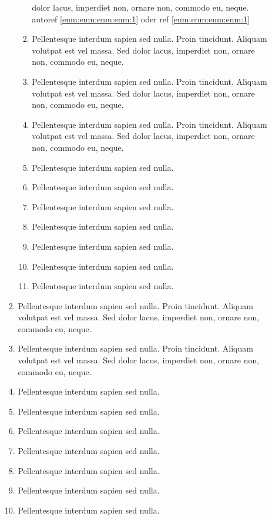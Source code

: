 \documentclass[ngerman]{scrartcl}
\begin{document}
\begin{enumerate}
\begin{enumerate}
\begin{enumerate}
\begin{enumerate}
		dolor lacus, imperdiet non, ornare non, commodo eu, neque.
											autoref \autoref{enm:enm:enm:enm:1} oder ref \ref{enm:enm:enm:enm:1}
								\item Pellentesque interdum sapien sed nulla. Proin tincidunt. Aliquam volutpat est vel massa. Sed
		dolor lacus, imperdiet non, ornare non, commodo eu, neque.\label{enm:enm:enm:enm:1}
								\item Pellentesque interdum sapien sed nulla. Proin tincidunt. Aliquam volutpat est vel massa. Sed
		dolor lacus, imperdiet non, ornare non, commodo eu, neque.
								\item Pellentesque interdum sapien sed nulla. Proin tincidunt. Aliquam volutpat est vel massa. Sed
		dolor lacus, imperdiet non, ornare non, commodo eu, neque.
								\item Pellentesque interdum sapien sed nulla.
								\item Pellentesque interdum sapien sed nulla.
								\item Pellentesque interdum sapien sed nulla.
								\item Pellentesque interdum sapien sed nulla.
								\item Pellentesque interdum sapien sed nulla.
								\item Pellentesque interdum sapien sed nulla.
								\item Pellentesque interdum sapien sed nulla.
							\end{enumerate}
						\item Pellentesque interdum sapien sed nulla. Proin tincidunt. Aliquam volutpat est vel massa. Sed
dolor lacus, imperdiet non, ornare non, commodo eu, neque.
						\item Pellentesque interdum sapien sed nulla. Proin tincidunt. Aliquam volutpat est vel massa. Sed
dolor lacus, imperdiet non, ornare non, commodo eu, neque.
						\item Pellentesque interdum sapien sed nulla.
						\item Pellentesque interdum sapien sed nulla.
						\item Pellentesque interdum sapien sed nulla.
						\item Pellentesque interdum sapien sed nulla.
						\item Pellentesque interdum sapien sed nulla.
						\item Pellentesque interdum sapien sed nulla.
						\item Pellentesque interdum sapien sed nulla.
					\end{enumerate}

\end{enumerate}
\end{enumerate}
\end{document}
